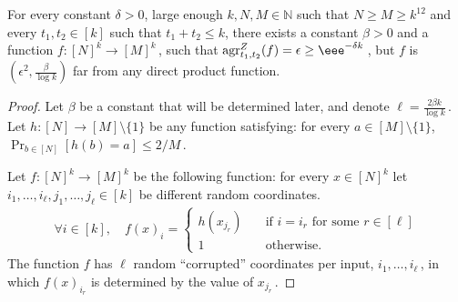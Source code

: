 \documentclass{toc}
\newcommand\f{f} %
\newcommand\h{h} %
\newcommand{\test}[2]{
	\ifx &#2&
	\textrm{agr}^{#1}
	\else	
	\textrm{agr}^{#1}_{#2}
	\fi}
\begin{document}
\begin{claim}\label{claim:lower bound k2}
	For every constant $\delta >0$, large enough $k,N,M\in\mathbb{N}$ such that $N\geq M\geq k^{12}$ and every $t_1,t_2\in[k]$ such that $t_1+t_2\leq k$, there exists a constant $\beta>0$ and a function $\f:[N]^k\rightarrow[M]^k$\,, such that $\test{Z}{t_1,t_2}(\f)= \epsilon\geq \eee^{-\delta k}$\,, but $\f$ is $(\epsilon^2, \frac{\beta}{\log k})$ far from any direct product function.
\end{claim}
\begin{proof}
    Let $\beta$ be a constant that will be determined later, and denote $\ell = \frac{2\beta k}{\log k}$\,.
    Let $\h:[N]\rightarrow[M]\setminus\{1\}$ be any function satisfying: for every $a\in[M]\setminus\{1\}$, $\Pr_{b\in[N]}[\h(b)=a]\leq 
    2/M$\,. %
    
    Let $\f:[N]^k\rightarrow[M]^k$ be the following function: for every $x\in[N]^k$ let $i_1,\ldots, i_{\ell},j_1,\ldots,  j_{\ell}\in [k]$ be different random coordinates.
    \begin{align*}
        \forall i\in[k],\quad \f(x)_i = \begin{cases}
    \h(x_{j_r}) \quad &\textrm{if }i=i_r \textrm{ for some } r\in[\ell]\\
    1 \quad&\textrm{otherwise.}
    \end{cases}
    \end{align*}
    The function $\f$ has $\ell$ random ``corrupted'' coordinates per input, $i_1,\ldots, i_\ell$\,, in which $\f(x)_{i_r}$ is determined by the value of $x_{j_r}$\,.
    

\end{proof}
\end{document}
